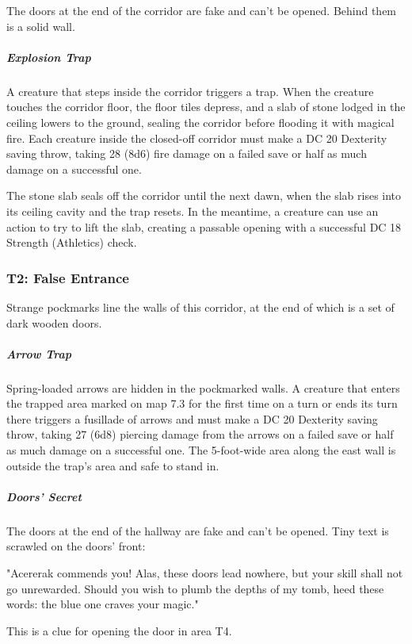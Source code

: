 \documentclass[10pt,a4paper,twoside,bg=print,twocolumn,openany,nodeprecatedcode]{dndbook}
\begin{document}
The doors at the end of the corridor are fake and can't be opened. Behind them is a solid wall.

\subparagraph{Explosion Trap}
A creature that steps inside the corridor triggers a trap. When the creature touches the corridor floor, the floor tiles depress, and a slab of stone lodged in the ceiling lowers to the ground, sealing the corridor before flooding it with magical fire. Each creature inside the closed-off corridor must make a DC 20 Dexterity saving throw, taking 28 (8d6) fire damage on a failed save or half as much damage on a successful one.

The stone slab seals off the corridor until the next dawn, when the slab rises into its ceiling cavity and the trap resets. In the meantime, a creature can use an action to try to lift the slab, creating a passable opening with a successful DC 18 Strength (Athletics) check.

\subsubsection{T2: False Entrance}
\begin{DndReadAloud}{}
Strange pockmarks line the walls of this corridor, at the end of which is a set of dark wooden doors.

\end{DndReadAloud}

\subparagraph{Arrow Trap}
Spring-loaded arrows are hidden in the pockmarked walls. A creature that enters the trapped area marked on map 7.3 for the first time on a turn or ends its turn there triggers a fusillade of arrows and must make a DC 20 Dexterity saving throw, taking 27 (6d8) piercing damage from the arrows on a failed save or half as much damage on a successful one. The 5-foot-wide area along the east wall is outside the trap's area and safe to stand in.

\subparagraph{Doors' Secret}
The doors at the end of the hallway are fake and can't be opened. Tiny text is scrawled on the doors' front:

\begin{DndReadAloud}{}
"Acererak commends you! Alas, these doors lead nowhere, but your skill shall not go unrewarded. Should you wish to plumb the depths of my tomb, heed these words: the blue one craves your magic."

\end{DndReadAloud}

This is a clue for opening the door in area T4.
\end{document}
